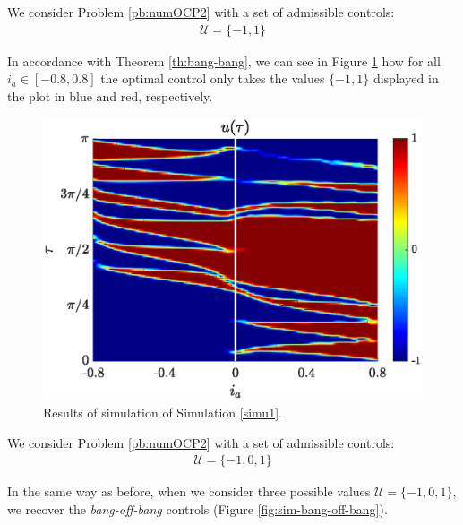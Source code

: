 \documentclass[twocolumn]{autart}    %
\begin{document}
\vspace{1em}
\begin{simulation}\label{simu1}
We consider Problem \ref{pb:numOCP2} with a set of admissible controls:
\begin{align*}
    \mathcal{U} = \{-1,1\}
\end{align*}
\end{simulation}
In accordance with Theorem \ref{th:bang-bang}, we can see in Figure \ref{fig:sim-bang-bang} how for all $i_a \in [-0.8,0.8]$ the optimal control only takes the values $\{-1,1\}$ displayed in the plot in blue and red, respectively.

\begin{figure}[ht!]
    \hspace{0.05em}
    \includegraphics[scale=0.525]{img/fig05.eps}
    \caption{Results of simulation of Simulation \ref{simu1}.}\label{fig:sim-bang-bang}
\end{figure} 

\vspace{1em}
\begin{simulation}\label{simu2}
We consider Problem \ref{pb:numOCP2} with a set of admissible controls:
\begin{align*}
	\mathcal{U} = \{-1,0,1\}
\end{align*}
\end{simulation}
In the same way as before, when we consider three possible values $\mathcal U = \{-1,0,1\}$, we recover the \emph{bang-off-bang} controls (Figure \ref{fig:sim-bang-off-bang}).
\end{document}

